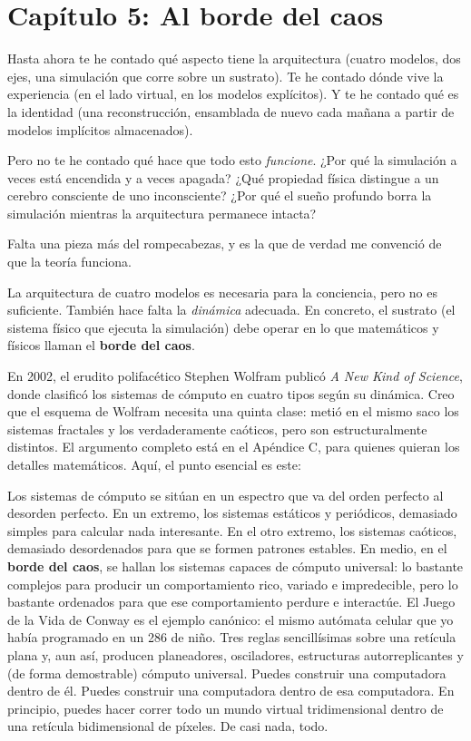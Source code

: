 \documentclass[11pt, twoside, openright]{book}
\begin{document}
\chapter*{Capítulo 5: Al borde del caos}

Hasta ahora te he contado qué aspecto tiene la arquitectura (cuatro modelos, dos ejes, una simulación que corre sobre un sustrato). Te he contado dónde vive la experiencia (en el lado virtual, en los modelos explícitos). Y te he contado qué es la identidad (una reconstrucción, ensamblada de nuevo cada mañana a partir de modelos implícitos almacenados).

Pero no te he contado qué hace que todo esto \textit{funcione}. ¿Por qué la simulación a veces está encendida y a veces apagada? ¿Qué propiedad física distingue a un cerebro consciente de uno inconsciente? ¿Por qué el sueño profundo borra la simulación mientras la arquitectura permanece intacta?

Falta una pieza más del rompecabezas, y es la que de verdad me convenció de que la teoría funciona.

La arquitectura de cuatro modelos es necesaria para la conciencia, pero no es suficiente. También hace falta la \textit{dinámica} adecuada. En concreto, el sustrato (el sistema físico que ejecuta la simulación) debe operar en lo que matemáticos y físicos llaman el \textbf{borde del caos}.

En 2002, el erudito polifacético Stephen Wolfram publicó \textit{A New Kind of Science}, donde clasificó los sistemas de cómputo en cuatro tipos según su dinámica. Creo que el esquema de Wolfram necesita una quinta clase: metió en el mismo saco los sistemas fractales y los verdaderamente caóticos, pero son estructuralmente distintos. El argumento completo está en el Apéndice C, para quienes quieran los detalles matemáticos. Aquí, el punto esencial es este:

Los sistemas de cómputo se sitúan en un espectro que va del orden perfecto al desorden perfecto. En un extremo, los sistemas estáticos y periódicos, demasiado simples para calcular nada interesante. En el otro extremo, los sistemas caóticos, demasiado desordenados para que se formen patrones estables. En medio, en el \textbf{borde del caos}, se hallan los sistemas capaces de cómputo universal: lo bastante complejos para producir un comportamiento rico, variado e impredecible, pero lo bastante ordenados para que ese comportamiento perdure e interactúe. El Juego de la Vida de Conway es el ejemplo canónico: el mismo autómata celular que yo había programado en un 286 de niño. Tres reglas sencillísimas sobre una retícula plana y, aun así, producen planeadores, osciladores, estructuras autorreplicantes y (de forma demostrable) cómputo universal. Puedes construir una computadora dentro de él. Puedes construir una computadora dentro de esa computadora. En principio, puedes hacer correr todo un mundo virtual tridimensional dentro de una retícula bidimensional de píxeles. De casi nada, todo.
\end{document}

